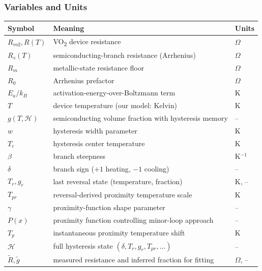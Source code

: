 \documentclass[11pt]{article}
\begin{document}
\subsubsection*{Variables and Units}
\begin{center}
\begin{tabular}{lll}
\toprule
Symbol & Meaning & Units \\
\midrule
\(R_{vo2},R(T)\) & VO\textsubscript{2} device resistance & \(\Omega\) \\
\(R_s(T)\) & semiconducting-branch resistance (Arrhenius) & \(\Omega\) \\
\(R_m\) & metallic-state resistance floor & \(\Omega\) \\
\(R_0\) & Arrhenius prefactor & \(\Omega\) \\
\(E_a/k_B\) & activation-energy-over-Boltzmann term & K \\
\(T\) & device temperature (our model: Kelvin) & K \\
\(g(T,\mathcal{H})\) & semiconducting volume fraction with hysteresis memory & -- \\
\(w\) & hysteresis width parameter & K \\
\(T_c\) & hysteresis center temperature & K \\
\(\beta\) & branch steepness & K\(^{-1}\) \\
\(\delta\) & branch sign (\(+1\) heating, \(-1\) cooling) & -- \\
\(T_r,g_r\) & last reversal state (temperature, fraction) & K, -- \\
\(T_{pr}\) & reversal-derived proximity temperature scale & K \\
\(\gamma\) & proximity-function shape parameter & -- \\
\(P(x)\) & proximity function controlling minor-loop approach & -- \\
\(T_p\) & instantaneous proximity temperature shift & K \\
\(\mathcal{H}\) & full hysteresis state \((\delta,T_r,g_r,T_{pr},\ldots)\) & -- \\
\(\tilde R,\tilde g\) & measured resistance and inferred fraction for fitting & \(\Omega\), -- \\
\bottomrule
\end{tabular}
\end{center}
\end{document}
